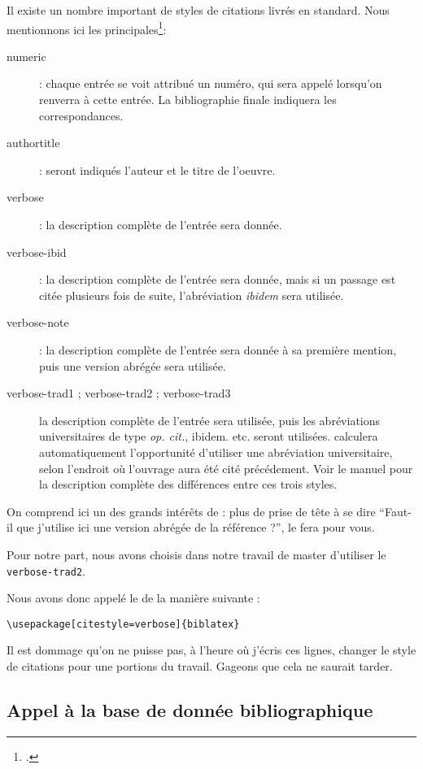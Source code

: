 Il existe un nombre important de styles de citations livrés en standard. Nous mentionnons ici les principales\footcite[Se reporter à][-61 pour plus de détails.]{biblatex}:
\begin{description}
\item[numeric] : chaque entrée se voit attribué un numéro, qui sera appelé lorsqu'on renverra à cette entrée. La bibliographie finale indiquera les correspondances.
\item[authortitle] : seront indiqués l'auteur et le titre de l'oeuvre.
\item[verbose]    : la description complète de l'entrée sera donnée.
\item[verbose-ibid] : la description complète de l'entrée sera donnée, mais si un passage est citée plusieurs fois de suite, l'abréviation \emph{ibidem} sera utilisée.
\item[verbose-note] : la description complète de l'entrée sera donnée à sa première mention, puis une version abrégée sera utilisée.
\item[verbose-trad1 ; verbose-trad2 ; verbose-trad3] la description complète de l'entrée sera utilisée, puis les abréviations universitaires de type \emph{op. cit.}, {ibidem.} etc. seront utilisées.  calculera automatiquement l'opportunité d'utiliser une abréviation universitaire, selon l'endroit où l'ouvrage aura été cité précédement. Voir le manuel pour la description complète des différences entre ces trois styles.
\end{description}

On comprend ici un des grands intérêts de \logiciel{\LaTeX} : plus de prise de tête à se dire \enquote{Faut-il que j'utilise ici une version abrégée de la référence ?},  le fera pour vous.

Pour notre part, nous avons choisis dans notre travail de master d'utiliser le  \verb|verbose-trad2|.

Nous avons donc appelé le  de la manière suivante : 
\begin{verbatim}
\usepackage[citestyle=verbose]{biblatex}
\end{verbatim}

Il est dommage qu'on ne puisse pas, à l'heure où j'écris ces lignes, changer le style de citations pour une portions du travail. Gageons que cela ne saurait tarder.

\subsection{Appel à la base de donnée bibliographique}

